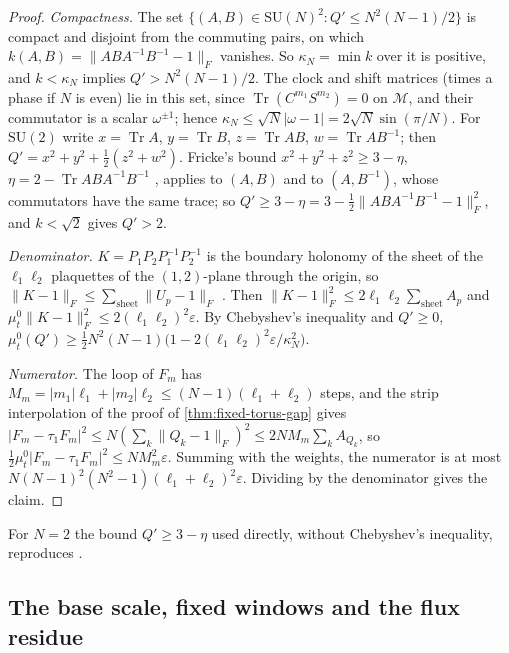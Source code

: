 \documentclass[11pt,a4paper]{amsart}
\theoremstyle{definition}
\theoremstyle{remark}
\numberwithin{equation}{section}
\DeclareMathOperator{\Tr}{Tr}        %
\newcommand{\norm}[1]{\lVert #1\rVert}     %
\newcommand{\abs}[1]{\lvert #1\rvert}      %
\newcommand{\SU}{\mathrm{SU}}              %
\begin{document}
\begin{proof}
\emph{Compactness.} The set $\{(A,B)\in\SU(N)^2:Q'\le N^2(N-1)/2\}$ is compact and disjoint from the commuting pairs, on which $k(A,B)=\norm{ABA^{-1}B^{-1}-1}_F$ vanishes. So $\kappa_N=\min k$ over it is positive, and $k<\kappa_N$ implies $Q'>N^2(N-1)/2$. The clock and shift matrices (times a phase if $N$ is even) lie in this set, since $\Tr(C^{m_1}S^{m_2})=0$ on $\mathcal M$, and their commutator is a scalar $\omega^{\pm1}$; hence $\kappa_N\le\sqrt N\abs{\omega-1}=2\sqrt N\sin(\pi/N)$. For $\SU(2)$ write $x=\Tr A$, $y=\Tr B$, $z=\Tr AB$, $w=\Tr AB^{-1}$; then $Q'=x^2+y^2+\frac12(z^2+w^2)$. Fricke's bound $x^2+y^2+z^2\ge3-\eta$, $\eta=2-\Tr ABA^{-1}B^{-1}$ \cite[Theorem~8, Step~3]{bhattacharjee2026first}, applies to $(A,B)$ and to $(A,B^{-1})$, whose commutators have the same trace; so $Q'\ge3-\eta=3-\frac12\norm{ABA^{-1}B^{-1}-1}_F^2$, and $k<\sqrt2$ gives $Q'>2$.

\emph{Denominator.} $K=P_1P_2P_1^{-1}P_2^{-1}$ is the boundary holonomy of the sheet of the $\ell_1\ell_2$ plaquettes of the $(1,2)$-plane through the origin, so $\norm{K-1}_F\le\sum_{\text{sheet}}\norm{U_p-1}_F$ \cite[Theorem~8, Step~3]{bhattacharjee2026first}. Then $\norm{K-1}_F^2\le2\ell_1\ell_2\sum_{\text{sheet}}A_p$ and $\mu^0_t\norm{K-1}_F^2\le2(\ell_1\ell_2)^2\varepsilon$. By Chebyshev's inequality and $Q'\ge0$, $\mu^0_t(Q')\ge\frac12N^2(N-1)\bigl(1-2(\ell_1\ell_2)^2\varepsilon/\kappa_N^2\bigr)$.

\emph{Numerator.} The loop of $F_m$ has $M_m=\abs{m_1}\ell_1+\abs{m_2}\ell_2\le(N-1)(\ell_1+\ell_2)$ steps, and the strip interpolation of the proof of \cref{thm:fixed-torus-gap} gives $\abs{F_m-\tau_1F_m}^2\le N(\sum_k\norm{Q_k-1}_F)^2\le2NM_m\sum_kA_{Q_k}$, so $\frac12\mu^0_t\abs{F_m-\tau_1F_m}^2\le NM_m^2\varepsilon$. Summing with the weights, the numerator is at most $N(N-1)^2(N^2-1)(\ell_1+\ell_2)^2\varepsilon$. Dividing by the denominator gives the claim.
\end{proof}

For $N=2$ the bound $Q'\ge3-\eta$ used directly, without Chebyshev's inequality, reproduces \cite[Theorem~8]{bhattacharjee2026first}.

\subsection{The base scale, fixed windows and the flux residue}
\end{document}
